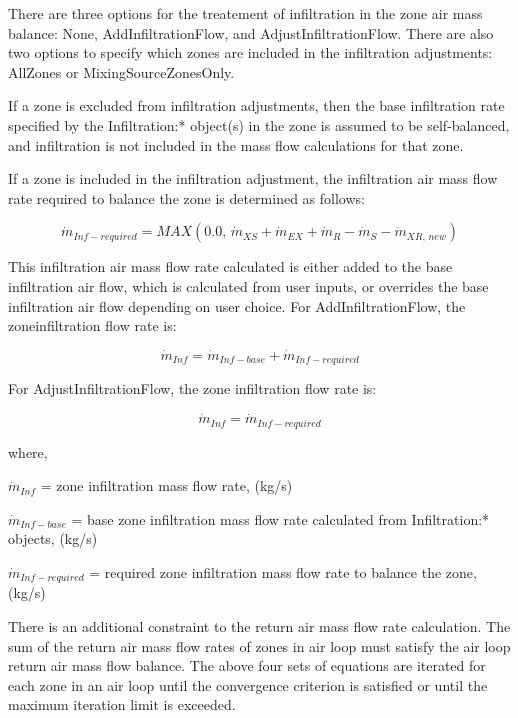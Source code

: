 There are three options for the treatement of infiltration in the zone air mass balance: None, AddInfiltrationFlow, and AdjustInfiltrationFlow. There are also two options to specify which zones are included in the infiltration adjustments: AllZones or MixingSourceZonesOnly.

If a zone is excluded from infiltration adjustments, then the base infiltration rate specified by the Infiltration:* object(s) in the zone is assumed to be self-balanced, and infiltration is not included in the mass flow calculations for that zone.

If a zone is included in the infiltration adjustment, the infiltration air mass flow rate required to balance the zone is determined as follows:

\begin{equation}
{\dot m_{Inf-required}} = MAX\left( {0.0,\,{{\dot m}_{XS}} + {{\dot m}_{EX}} + {{\dot m}_{R}} - {{\dot m}_S}  - {\dot m_{XR,\,new}}} \right)
\end{equation}

This infiltration air mass flow rate calculated is either added to the base infiltration air flow, which is calculated from user inputs, or overrides the base infiltration air flow depending on user choice. For AddInfiltrationFlow, the zoneinfiltration flow rate is:

\begin{equation}
{\dot m_{Inf}} = {\dot m_{Inf-base}} + {\dot m_{Inf-required}}
\end{equation}

For AdjustInfiltrationFlow, the zone infiltration flow rate is:

\begin{equation}
{\dot m_{Inf}} = {\dot m_{Inf-required}}
\end{equation}

where,

\({\dot m_{Inf}}\) = zone infiltration mass flow rate, (kg/s)

\({\dot m_{Inf-base}}\) = base zone infiltration mass flow rate calculated from Infiltration:* objects, (kg/s)

\({\dot m_{Inf-required}}\) = required zone infiltration mass flow rate to balance the zone, (kg/s)

There is an additional constraint to the return air mass flow rate calculation. The sum of the return air mass flow rates of zones in air loop must satisfy the air loop return air mass flow balance. The above four sets of equations are iterated for each zone in an air loop until the convergence criterion is satisfied or until the maximum iteration limit is exceeded.

